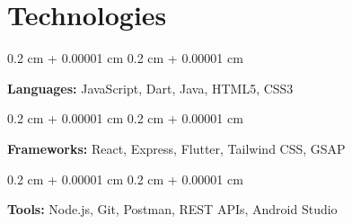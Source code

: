 \documentclass[10pt, a4paper]{article}
\newenvironment{onecolentry}{
    \begin{adjustwidth}{
        0.2 cm + 0.00001 cm
    }{
        0.2 cm + 0.00001 cm
    }
}{
    \end{adjustwidth}
} %
\begin{document}
    \section{Technologies}
    
            \begin{onecolentry}
                \textbf{Languages:} JavaScript, Dart, Java, HTML5, CSS3
            \end{onecolentry}
            \vspace{0.1cm}
            \begin{onecolentry}
                \textbf{Frameworks:} React, Express, Flutter, Tailwind CSS, GSAP
            \end{onecolentry}
            \vspace{0.1 cm}
            \begin{onecolentry}
            \textbf{Tools:} Node.js, Git, Postman, REST APIs, Android Studio
            \end{onecolentry}
        
\end{document}

